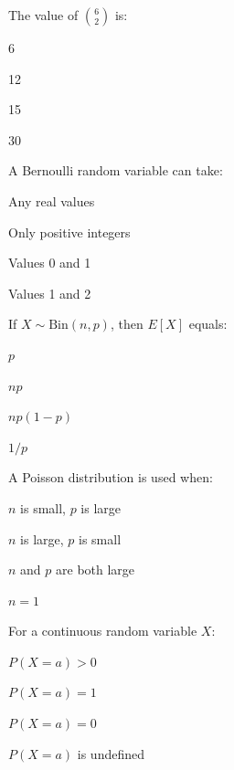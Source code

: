 \documentclass{CWNUExam}
\begin{document}
\begin{question}
The value of $\binom{6}{2}$ is:
\paren
\begin{choices}
\item 6
\item 12
\item 15
\item 30
\end{choices}
\end{question}

\begin{question}
A Bernoulli random variable can take:
\paren
\begin{choices}
\item Any real values
\item Only positive integers
\item Values 0 and 1
\item Values 1 and 2
\end{choices}
\end{question}

\begin{question}
If $X\sim\mathrm{Bin}(n,p)$, then $E[X]$ equals:
\paren
\begin{choices}
\item $p$
\item $np$
\item $np(1-p)$
\item $1/p$
\end{choices}
\end{question}

\begin{question}
A Poisson distribution is used when:
\paren
\begin{choices}
\item $n$ is small, $p$ is large
\item $n$ is large, $p$ is small
\item $n$ and $p$ are both large
\item $n=1$
\end{choices}
\end{question}

\begin{question}
For a continuous random variable $X$:
\paren
\begin{choices}
\item $P(X=a)>0$
\item $P(X=a)=1$
\item $P(X=a)=0$
\item $P(X=a)$ is undefined
\end{choices}
\end{question}
\end{document}
